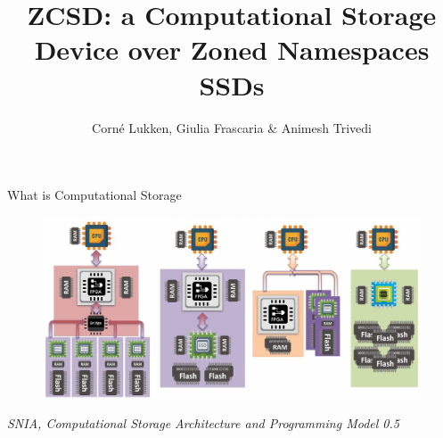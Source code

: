 \documentclass{beamer}
\author{Corné Lukken, Giulia Frascaria \& Animesh Trivedi}
\title{ZCSD: a Computational Storage Device over Zoned Namespaces SSDs}
\begin{document}
\frame{\titlepage}
\begin{frame}{What is Computational Storage}
	\begingroup
	\small
			\begin{figure}
				\centering
				\includegraphics[width=1\textwidth]{resources/images/comp-stor2}
			\end{figure}
	\textit{\tiny SNIA, Computational Storage Architecture and Programming
	Model 0.5\cite{snia-model}}
	\endgroup
\end{frame}

\end{document}
